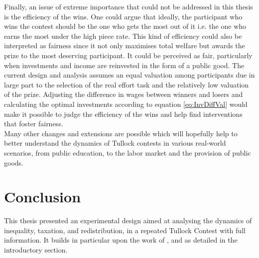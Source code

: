 Finally, an issue of extreme importance that could not be addressed in this thesis is the efficiency of the wins. One could argue that ideally, the participant who wins the contest should be the one who gets the most out of it i.e. the one who earns the most under the high piece rate. This kind of efficiency could also be interpreted as fairness since it not only maximises total welfare but awards the prize to the most deserving participant. It could be perceived as fair, particularly when investments and income are reinvested in the form of a public good. The current design and analysis assumes an equal valuation among participants due in large part to the selection of the real effort task and the relatively low valuation of the prize. Adjusting the difference in wages between winners and losers and calculating the optimal investments according to equation \ref{eq:InvDiffVal} would make it possible to judge the efficiency of the wins and help find interventions that foster fairness.\\

Many other changes and extensions are possible which will hopefully help to better understand the dynamics of Tullock contests in various real-world scenarios, from public education, to the labor market and the provision of public goods.\\

\chapter{Conclusion}
\label{ch:conclusion}

This thesis presented an experimental design aimed at analysing the dynamics of inequality, taxation, and redistribution, in a repeated Tullock Contest with full information. It builds in particular upon the work of \cite{sheremeta2010a}, \cite{fallucchi2017} and \cite{benabou2001} as detailed in the introductory section.\\


